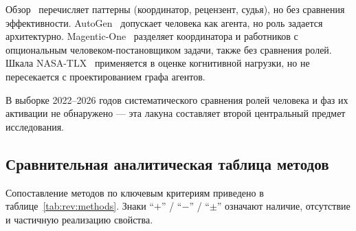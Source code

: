 Обзор~\cite{wang2024} перечисляет паттерны (координатор,
рецензент, судья), но без сравнения эффективности. AutoGen~\cite{wu2023}
допускает человека как агента, но роль задается архитектурно.
Magentic-One~\cite{magenticone2024} разделяет координатора и
работников с опциональным человеком-постановщиком задачи, также
без сравнения ролей. Шкала NASA-TLX~\cite{nasatlx1988} применяется
в оценке когнитивной нагрузки, но не пересекается с проектированием
графа агентов.

В выборке 2022--2026 годов систематического сравнения ролей
человека и фаз их активации не обнаружено --- эта лакуна составляет
второй центральный предмет исследования.

\subsection{Сравнительная аналитическая таблица методов}
\label{sec:rev:comparison}

Сопоставление методов по ключевым критериям приведено в
таблице~\ref{tab:rev:methods}. Знаки \enquote{$+$} / \enquote{$-$}
/ \enquote{$\pm$} означают наличие, отсутствие и частичную
реализацию свойства.

